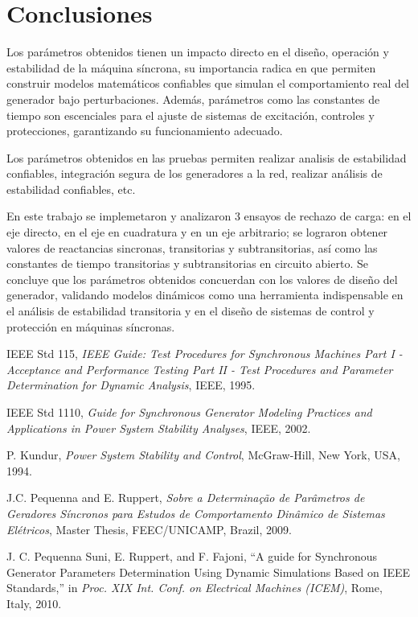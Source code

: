 \documentclass[conference]{IEEEtran}
\begin{document}
\section{Conclusiones}

Los parámetros obtenidos tienen un impacto directo en el diseño, operación y estabilidad de la máquina síncrona, su importancia radica en que permiten construir modelos matemáticos confiables que simulan el comportamiento real del generador bajo perturbaciones. Además, parámetros como las constantes de tiempo son escenciales para el ajuste de sistemas de excitación, controles y protecciones, garantizando su funcionamiento adecuado.

Los parámetros obtenidos en las pruebas permiten realizar analisis de estabilidad confiables, integración segura de los generadores a la red, realizar análisis de estabilidad confiables, etc.

En este trabajo se implemetaron y analizaron 3 ensayos de rechazo de carga: en el eje directo, en el eje en cuadratura y en un eje arbitrario;
se lograron obtener valores de reactancias sincronas, transitorias y subtransitorias, así como las constantes de tiempo transitorias y subtransitorias en circuito abierto. Se concluye que los parámetros obtenidos concuerdan con los valores de diseño del generador, validando modelos dinámicos como una herramienta indispensable en el análisis
 de estabilidad transitoria y en el diseño de sistemas de control y protección en máquinas síncronas.
\begin{thebibliography}{plain}

IEEE Std 115, \emph{IEEE Guide: Test Procedures for Synchronous Machines Part I - Acceptance and Performance Testing Part II - Test Procedures and Parameter Determination for Dynamic Analysis}, IEEE, 1995.

IEEE Std 1110, \emph{Guide for Synchronous Generator Modeling Practices and Applications in Power System Stability Analyses}, IEEE, 2002.

P. Kundur, \emph{Power System Stability and Control}, McGraw-Hill, New York, USA, 1994.

J.C. Pequenna and E. Ruppert, \emph{Sobre a Determina\c{c}\~ao de Par\^ametros de Geradores S\'incronos para Estudos de Comportamento Din\^amico de Sistemas El\'etricos}, Master Thesis, FEEC/UNICAMP, Brazil, 2009.

J. C. Pequenna Suni, E. Ruppert, and F. Fajoni, ``A guide for Synchronous Generator Parameters Determination Using Dynamic Simulations Based on IEEE Standards,'' in \emph{Proc. XIX Int. Conf. on Electrical Machines (ICEM)}, Rome, Italy, 2010.

\end{thebibliography}
\end{document}
